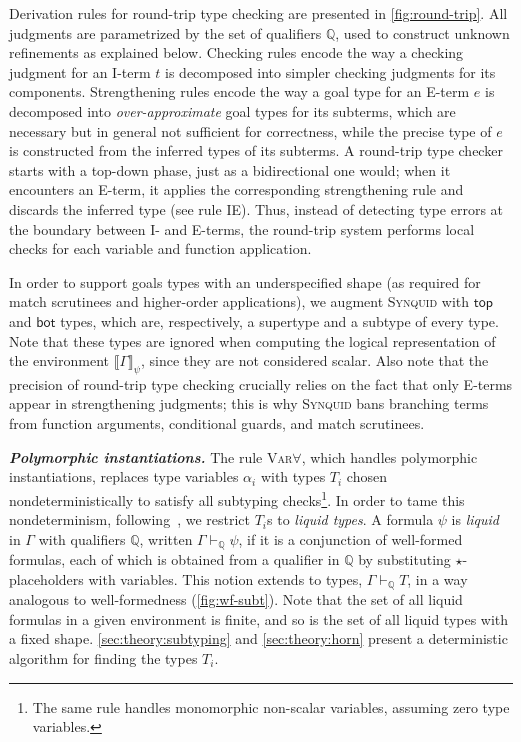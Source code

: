 \documentclass[10pt,preprint]{sigplanconf-pldi16}
\theoremstyle{definition}
\newcommand{\custompar}[1]{\parskip 0pt \textbf{\textit{#1}}}
\newcommand{\env}{\Gamma}
\newcommand{\ttop}{\mathsf{top}}
\newcommand{\tbot}{\mathsf{bot}}
\newcommand{\quals}{\mathbb{Q}}
\newcommand{\entailsQ}{\vdash_{\quals}}
\newcommand{\lang}{\textsc{Synquid}\xspace}
\begin{document}
Derivation rules for round-trip type checking are presented in \autoref{fig:round-trip}.
All judgments are parametrized by the set of qualifiers $\quals$,
used to construct unknown refinements as explained below.
Checking rules encode the way a checking judgment for an I-term $t$ is decomposed into simpler checking judgments for its components.
Strengthening rules encode the way a goal type for an E-term $e$ is decomposed into \emph{over-approximate} goal types for its subterms, 
which are necessary but in general not sufficient for correctness,
while the precise type of $e$ is constructed from the inferred types of its subterms.
A round-trip type checker starts with a top-down phase, just as a bidirectional one would;
when it encounters an E-term, it applies the corresponding strengthening rule and discards the inferred type (see rule \textsc{IE}).
Thus, instead of detecting type errors at the boundary between I- and E-terms,
the round-trip system performs local checks for each variable and function application.

In order to support goals types with an underspecified shape
(as required for match scrutinees and higher-order applications),
we augment \lang with $\ttop$ and $\tbot$ types,
which are, respectively, a supertype and a subtype of every type.
Note that these types are ignored when computing the logical representation of the environment $\llbracket\env\rrbracket_\psi$,
since they are not considered scalar.
Also note that the precision of round-trip type checking crucially relies
on the fact that only E-terms appear in strengthening judgments;
this is why \lang bans branching terms from function arguments, conditional guards, and match scrutinees.

\custompar{Polymorphic instantiations.}
The rule \textsc{Var$\forall$}, which handles polymorphic instantiations,
replaces type variables $\alpha_i$ with types $T_i$ chosen nondeterministically to satisfy all subtyping checks\footnote{The same rule handles monomorphic non-scalar variables, assuming zero type variables.}.
In order to tame this nondeterminism, following~\cite{RondonKaJh08}, we restrict $T_i$s to \emph{liquid types}.
A formula $\psi$ is \emph{liquid} in $\env$ with qualifiers $\quals$,
written $\env \entailsQ \psi$,
if it is a conjunction of well-formed formulas, 
each of which is obtained from a qualifier in $\quals$ by substituting $\star$-placeholders with variables.
This notion extends to types, $\env \entailsQ T$, in a way analogous to well-formedness (\autoref{fig:wf-subt}).
Note that the set of all liquid formulas in a given environment is finite,
and so is the set of all liquid types with a fixed shape.
\autoref{sec:theory:subtyping} and \autoref{sec:theory:horn} present a deterministic algorithm for finding the types $T_i$. 
\end{document}
